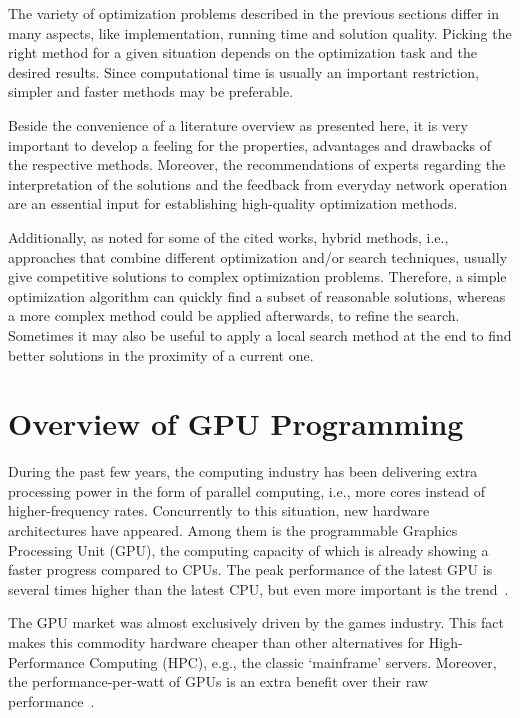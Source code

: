 The variety of optimization problems described in the previous sections
differ in many aspects, like implementation, running time and solution
quality. Picking the right method for a given situation depends on
the optimization task and the desired results. Since computational
time is usually an important restriction, simpler and faster methods
may be preferable.

Beside the convenience of a literature overview as presented here,
it is very important to develop a feeling for the properties, advantages
and drawbacks of the respective methods. Moreover, the recommendations
of experts regarding the interpretation of the solutions and the feedback
from everyday network operation are an essential input for establishing
high-quality optimization methods.

Additionally, as noted for some of the cited works, hybrid methods,
i.e., approaches that combine different optimization and/or search
techniques, usually give competitive solutions to complex optimization
problems. Therefore, a simple optimization algorithm can quickly find
a subset of reasonable solutions, whereas a more complex method could
be applied afterwards, to refine the search. Sometimes it may also
be useful to apply a local search method at the end to find better
solutions in the proximity of a current one.


\chapter{Overview of GPU Programming \label{chap:02-Principles_of_GPU_programming}}

During the past few years, the computing industry has been delivering
extra processing power in the form of parallel computing, i.e., more
cores instead of higher-frequency rates. Concurrently to this situation,
new hardware architectures have appeared. Among them is the programmable
Graphics Processing Unit (GPU),
the computing capacity of which is already showing a faster progress
compared to CPUs. The peak performance of the latest GPU is several
times higher than the latest CPU, but even more important is the trend~\cite{Cruz-How_to_obtain_efficient_GPU_kernels:2011}.

The GPU market was almost exclusively driven by the games industry.
This fact makes this commodity hardware cheaper than other alternatives
for High-Performance Computing (HPC),
e.g., the classic \textquoteleft{}mainframe\textquoteright{} servers.
Moreover, the performance-per-watt of GPUs is an extra benefit over
their raw performance~\cite{Cruz-How_to_obtain_efficient_GPU_kernels:2011}.

